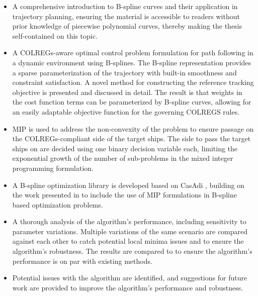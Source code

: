 \begin{itemize}
    \item A comprehensive introduction to B-spline curves and their application in trajectory planning, ensuring the material is accessible to readers without prior knowledge of piecewise polynomial curves, thereby making the thesis self-contained on this topic.
    \item A COLREGs-aware optimal control problem formulation for path following in a dynamic environment using B-splines. The B-spline representation provides a sparse parameterization of the trajectory with built-in smoothness and constraint satisfaction.
    A novel method for constructing the reference tracking objective is presented and discussed in detail. The result is that weights in the cost function terms can be parameterized by B-spline curves, allowing for an easily adaptable objective function for the governing COLREGS rules.
    \item \acrfull{MIP} is used to address the non-convexity of the problem to ensure passage on the COLREGs-compliant side of the target ships.
    The side to pass the target ships on are decided using one binary decision variable each, limiting the exponential growth of the number of sub-problems in the mixed integer programming formulation.
    \item A B-spline optimization library is developed based on CasAdi \citep{casadi}, building on the work presented in \citet{mercy2016spline} to include the use of \gls{MIP} formulations in B-spline based optimization problems.
    \item A thorough analysis of the algorithm's performance, including sensitivity to parameter variations. Multiple variations of the same scenario are compared against each other to catch potential local minima issues and to ensure the algorithm's robustness. The results are compared to \citet{Thyri2022-MPC} to ensure the algorithm's performance is on par with existing methods.
    \item Potential issues with the algorithm are identified, and suggestions for future work are provided to improve the algorithm's performance and robustness.
\end{itemize}


